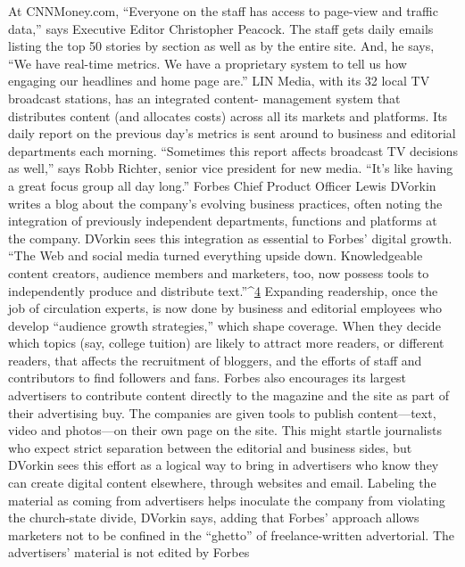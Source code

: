 At CNNMoney.com, ``Everyone on the staff has access to page-view and traffic
data,'' says Executive Editor Christopher Peacock. The staff gets daily emails
listing the top 50 stories by section as well as by the entire site. And, he says, ``We
have real-time metrics. We have a proprietary system to tell us how engaging our
headlines and home page are.''
LIN Media, with its 32 local TV broadcast stations, has an integrated content-
management system that distributes content (and allocates costs) across all
its markets and platforms. Its daily report on the previous day’s metrics is sent
around to business and editorial departments each morning. ``Sometimes this
report affects broadcast TV decisions as well,'' says Robb Richter, senior vice
president for new media. ``It’s like having a great focus group all day long.''
Forbes Chief Product Officer Lewis DVorkin writes a blog about the company’s
evolving business practices, often noting the integration of previously independent
departments, functions and platforms at the company. DVorkin sees
this integration as essential to Forbes’ digital growth. ``The Web and social media
turned everything upside down. Knowledgeable content creators, audience
members and marketers, too, now possess tools to independently produce and
distribute text.''^{\href{#endnotes-ch9}{4}} Expanding readership, once the job of circulation experts, is
now done by business and editorial employees who develop ``audience growth
strategies,'' which shape coverage. When they decide which topics (say, college
tuition) are likely to attract more readers, or different readers, that affects the recruitment
of bloggers, and the efforts of staff and contributors to find followers
and fans.
Forbes also encourages its largest advertisers to contribute content directly
to the magazine and the site as part of their advertising buy. The companies are
given tools to publish content—text, video and photos—on their own page
on the site. This might startle journalists who expect strict separation between
the editorial and business sides, but DVorkin sees this effort as a logical way to
bring in advertisers who know they can create digital content elsewhere, through
websites and email. Labeling the material as coming from advertisers helps inoculate
the company from violating the church-state divide, DVorkin says, adding
that Forbes’ approach allows marketers not to be confined in the ``ghetto''
of freelance-written advertorial. The advertisers’ material is not edited by Forbes

